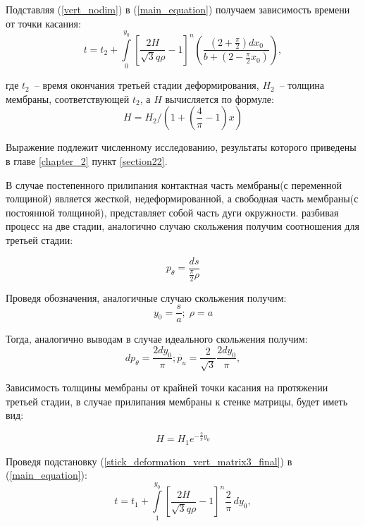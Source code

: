 	Подставляя (\ref{vert_nodim}) в (\ref{main_equation}) получаем зависимость времени от точки касания:
	\begin{equation}
	t = t_2+ \int\limits_0^{y_0}\left[ \dfrac{2H}{\sqrt3 q \rho} -1\right]^n\left(\dfrac{\left( 2+\frac{\pi}{2}\right)dx_0}{b+\left(2-\frac{\pi}{2}x_0\right)}\right),
	\end{equation}
	
где $t_2$~-- время окончания третьей стадии деформирования, $H_2$~-- толщина мембраны, соответствующей $t_2$, а $H$ вычисляется по формуле:
\begin{equation}
 H = H_2/(1+(\dfrac{4}{\pi} - 1)x)
\end{equation}   

Выражение подлежит численному исследованию, результаты которого приведены в главе \ref{chapter_2} пункт \ref{section22}.

В случае постепенного прилипания контактная часть мембраны(с переменной толщиной)
является жесткой, недеформированной, а свободная часть мембраны(с постоянной толщиной), представляет собой часть дуги окружности.
разбивая процесс на две стадии, аналогично случаю скольжения получим соотношения для третьей стадии:

\begin{equation}
p_\theta = \dfrac{ds}{\frac{\pi}{2}\rho}
\label{stick_deformation_vert_matrix3}
\end{equation}

Проведя обозначения, аналогичные случаю скольжения получим: 
\begin{equation}
y_0 = \dfrac{s}{a}; \; \rho = a
\end{equation}

Тогда, аналогично выводам в случае идеального скольжения получим:
\begin{equation}
	dp_\theta = \dfrac{2dy_0}{\pi};
	\dot{p_u} = \dfrac{2}{\sqrt 3}\dfrac{2dy_0}{\pi},
\label{stick_deformation_vert_matrix3_final}
\end{equation}

Зависимость толщины мембраны от крайней точки касания на протяжении третьей стадии,
 в случае прилипания мембраны к стенке матрицы, будет иметь вид:
    
 \begin{equation}
   H = H_1 e^{-\frac{2}{\pi}y_0}
   \end{equation}
   
   Проведя подстановку (\ref{stick_deformation_vert_matrix3_final}) в (\ref{main_equation}):
 \begin{equation}
   t = t_1 + \int\limits^{y_0}_1 \left[ \dfrac{2H}{\sqrt3 q \rho} -1\right]^n\dfrac{2}{\pi}\,dy_0,
   \end{equation}

